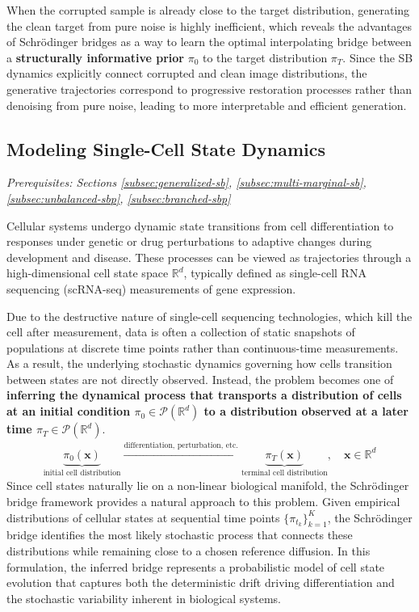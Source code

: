 \documentclass{article}
\begin{document}
When the corrupted sample is already close to the target distribution, generating the clean target from pure noise is highly inefficient, which reveals the advantages of Schrödinger bridges as a way to learn the optimal interpolating bridge between a \textbf{structurally informative prior} $\pi_0$ to the target distribution $\pi_T$. Since the SB dynamics explicitly connect corrupted and clean image distributions, the generative trajectories correspond to progressive restoration processes rather than denoising from pure noise, leading to more interpretable and efficient generation. 

\subsection{Modeling Single-Cell State Dynamics}
\label{subsec:cell-modeling}
\textit{Prerequisites: Sections \ref{subsec:generalized-sb}, \ref{subsec:multi-marginal-sb}, \ref{subsec:unbalanced-sbp}, \ref{subsec:branched-sbp}}

Cellular systems undergo dynamic state transitions from cell differentiation to responses under genetic or drug perturbations to adaptive changes during development and disease. These processes can be viewed as trajectories through a high-dimensional cell state space $\mathbb{R}^d$, typically defined as single-cell RNA sequencing (scRNA-seq) measurements of gene expression.

Due to the destructive nature of single-cell sequencing technologies, which kill the cell after measurement, data is often a collection of static snapshots of populations at discrete time points rather than continuous-time measurements. As a result, the underlying stochastic dynamics governing how cells transition between states are not directly observed. Instead, the problem becomes one of \textbf{inferring the dynamical process that transports a distribution of cells at an initial condition $\pi_0\in \mathcal{P}(\mathbb{R}^d)$ to a distribution observed at a later time $\pi_T\in \mathcal{P}(\mathbb{R}^d)$}.
\begin{align}
    \underbrace{\pi_0(\boldsymbol{x})}_{\text{initial cell distribution}}\xrightarrow{\text{differentiation, perturbation, etc.}}\underbrace{\pi_T(\boldsymbol{x})}_{\text{terminal cell distribution}}, \quad \boldsymbol{x}\in \mathbb{R}^d
\end{align}
Since cell states naturally lie on a non-linear biological manifold, the Schrödinger bridge framework provides a natural approach to this problem. Given empirical distributions of cellular states at sequential time points $\{\pi_{t_k}\}_{k=1}^K$, the Schrödinger bridge identifies the most likely stochastic process that connects these distributions while remaining close to a chosen reference diffusion. In this formulation, the inferred bridge represents a probabilistic model of cell state evolution that captures both the deterministic drift driving differentiation and the stochastic variability inherent in biological systems.
\end{document}
